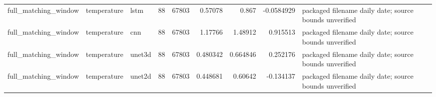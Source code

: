 \begin{tabular}{lllrrrrrl}
full_matching_window & temperature & lstm & 88 & 67803 & 0.57078 & 0.867 & -0.0584929 & packaged filename daily date; source bounds unverified \\
full_matching_window & temperature & cnn & 88 & 67803 & 1.17766 & 1.48912 & 0.915513 & packaged filename daily date; source bounds unverified \\
full_matching_window & temperature & unet3d & 88 & 67803 & 0.480342 & 0.664846 & 0.252176 & packaged filename daily date; source bounds unverified \\
full_matching_window & temperature & unet2d & 88 & 67803 & 0.448681 & 0.60642 & -0.134137 & packaged filename daily date; source bounds unverified \\
\bottomrule
\end{tabular}
